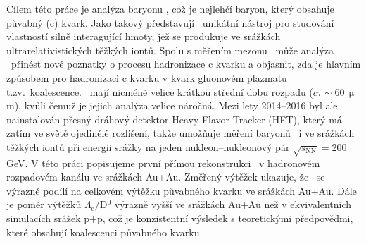 Cílem této práce je analýza baryonu \Lambdac, což je nejlehčí baryon, který obsahuje půvabný (c) kvark. Jako takový představují \Lambdac\ unikátní nástroj pro studování vlastností silně interagující hmoty, jež se produkuje ve srážkách ultrarelativistických těžkých iontů. Spolu s měřením mezonu \dzero\ může analýza \Lambdac\ přinést nové poznatky o procesu hadronizace c kvarku a objasnit, zda je hlavním způsobem pro hadronizaci c kvarku v kvark gluonovém plazmatu t.zv.\ koalescence. \Lambdac\ mají nicméně velice krátkou střední dobu rozpadu ($c \tau \sim 60\,\upmu$m), kvůli čemuž je jejich analýza velice náročná. Mezi lety 2014--2016 byl ale nainstalován přesný dráhový detektor Heavy Flavor Tracker (HFT), který má zatím ve světě ojedinělé rozlišení, takže umožňuje měření baryonů \Lambdac\ i ve srážkách těžkých iontů při energii srážky na jeden nukleon--nukleonový pár $\sqrt{s_\mathrm{NN}} = 200\,$GeV. V této práci popisujeme první přímou rekonstrukci \Lambdac\ v hadronovém rozpadovém kanálu ve srážkách Au+Au. Změřený výtěžek ukazuje, že \Lambdac\ se výrazně podílí na celkovém výtěžku půvabného kvarku ve srážkách Au+Au. Dále je poměr výtěžků $\Lambda_\mathrm{c}/$D$^0$ výrazně vyšší ve srážkách Au+Au než v ekvivalentních simulacích srážek p+p, což je konzistentní výsledek s teoretickými předpověďmi, které obsahují koalescenci půvabného kvarku. 







